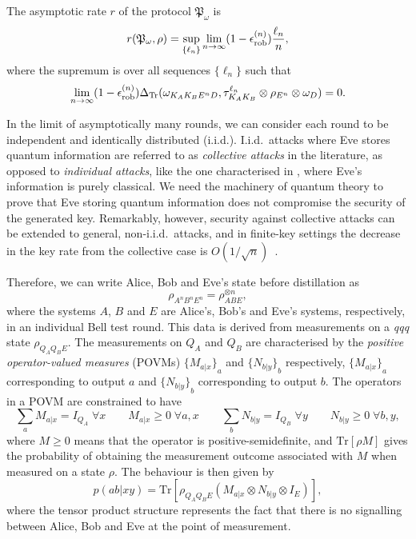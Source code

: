 \documentclass[10pt, a4paper]{article}
\numberwithin{equation}{section} %
\theoremstyle{definition}
\theoremstyle{plain}
\newcommand{\?}{\mathrel{?}} %
\newcommand{\Tr}{\mathrm{Tr}} %
\newcommand{\rob}{\rm rob}
\newcommand{\erob}[1]{\epsilon_{\rob}^{(#1)}}
\begin{document}
    The asymptotic rate \(r\) of the protocol \(\mathfrak{P}_{\omega}\) is~\cite{CQKeyDistill}
    \begin{equation}
      r(\mathfrak{P}_{\omega}, \rho) = \sup_{\{\ell_n\}} \lim_{n\to\infty} (1-\erob{n}) \frac{\ell_n}{n},
    \end{equation}
    where the supremum is over all sequences \(\{\ell_n\}\) such that
    \[ \lim_{n\to\infty} (1-\erob{n})\Delta_{\Tr}(\omega_{K_A K_B E^n D}, \tau_{K_A K_B}^{\ell_n} \otimes \rho_{E^n} \otimes \omega_{D}) = 0. \]

    In the limit of asymptotically many rounds, we can consider each round to be independent and identically distributed (i.i.d.). I.i.d.\ attacks where Eve stores quantum information are referred to as \emph{collective attacks} in the literature, as opposed to \emph{individual attacks}, like the one characterised in , where Eve's information is purely classical. We need the machinery of quantum theory to prove that Eve storing quantum information does not compromise the security of the generated key. Remarkably, however, security against collective attacks can be extended to general, non-i.i.d.\ attacks, and in finite-key settings the decrease in the key rate from the collective case is \(O(1/\sqrt{n})\)~\cite{DI_Proofs, DIQKD_PracticalEAT}.

    Therefore, we can write Alice, Bob and Eve's state before distillation as
    \[ \rho_{A^n B^n E^n} = \rho_{ABE}^{\otimes n}, \]
    where the systems \(A\), \(B\) and \(E\) are Alice's, Bob's and Eve's systems, respectively, in an individual Bell test round. This data is derived from measurements on a \emph{qqq} state \(\rho_{Q_A Q_B E}\). The measurements on \(Q_A\) and \(Q_B\) are characterised by the \emph{positive operator-valued measures} (POVMs)  \({\{M_{a|x}\}}_{a}\) and \({\{N_{b|y}\}}_{b}\) respectively, \({\{M_{a|x}\}}_{a}\) corresponding to output \(a\) and \({\{N_{b|y}\}}_{b}\) corresponding to output \(b\). The operators in a POVM are constrained to have
    \[ \sum_{a} M_{a|x} = I_{Q_A}\;\forall x \qquad M_{a|x} \geq 0\;\forall a, x \qquad \sum_{b} N_{b|y} = I_{Q_B}\;\forall y \qquad N_{b|y} \geq 0\;\forall b, y, \]
    where \(M \geq 0\) means that the operator is positive-semidefinite, and \(\Tr\left[\rho M\right]\) gives the probability of obtaining the measurement outcome associated with \(M\) when measured on a state \(\rho\). The behaviour is then given by
    \begin{equation}\label{eqn:probmeas}
      p(ab|xy) = \Tr\left[\rho_{Q_A Q_B E} \left(M_{a|x} \otimes N_{b|y} \otimes I_{E}\right) \right],
    \end{equation}
    where the tensor product structure represents the fact that there is no signalling between Alice, Bob and Eve at the point of measurement.
\end{document}
